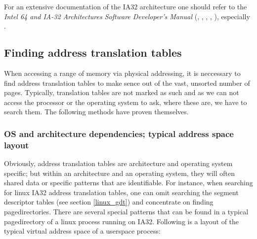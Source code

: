 For an extensive documentation of the IA32 architecture one should refer to the
\emph{Intel 64 and IA-32 Architectures Software Developer's Manual}
(\cite{IA32_SDM_1:2006}, \cite{IA32_SDM_2a:2006}, \cite{IA32_SDM_2b:2006},
\cite{IA32_SDM_3a:2006}, \cite{IA32_SDM_3b:2006}), especially
\cite{IA32_SDM_3a:2006}.



\subsection{Finding address translation tables}
\label{findingATT}

When accessing a range of memory via physical addressing, it is neccessary to
find address translation tables to make sence out of the vast, unsorted number
of pages. Typically, translation tables are not marked as such and as we can not
access the processor or the operating system to ask, where these are, we have to
search them. The following methods have proven themselves.



\subsubsection{OS and architecture dependencies; typical address space layout}

Obviously, address translation tables are architecture and operating system
specific; but within an architecture and an operating system, they will often
shared data or specific patterns that are identifiable. For instance, when
searching for linux IA32 address translation tables, one can omit searching the
segment descriptor tables (see section \ref{linux_gdt}) and concentrate on
finding pagedirectories. There are several special patterns that can be found in
a typical pagedirectory of a linux process running on IA32. Following is a
layout of the typical virtual address space of a userspace process:


